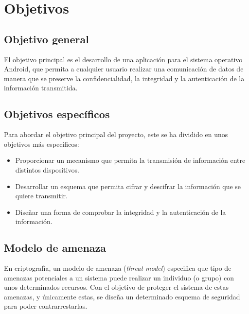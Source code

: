 
\chapter{Objetivos} %

\label{Chapter2}


\section{Objetivo general}

El objetivo principal es el desarrollo de una aplicación para el sistema operativo Android, que permita a cualquier usuario realizar una comunicación de datos de manera que se preserve la confidencialidad, la integridad y la autenticación de la información transmitida.


\section{Objetivos específicos}

Para abordar el objetivo principal del proyecto, este se ha dividido en unos objetivos más específicos:

\begin{itemize}
  \item Proporcionar un mecanismo que permita la transmisión de información entre distintos dispositivos.
  \item Desarrollar un esquema que permita cifrar y descifrar la información que se quiere transmitir.
  \item Diseñar una forma de comprobar la integridad y la autenticación de la información.
\end{itemize}


\section{Modelo de amenaza}

En criptografía, un modelo de amenaza (\emph{threat model}) especifica que tipo de amenazas potenciales a un sistema puede realizar un individuo (o grupo) con unos determinados recursos. Con el objetivo de proteger el sistema de estas amenazas, y únicamente estas, se diseña un determinado esquema de seguridad para poder contrarrestarlas.

